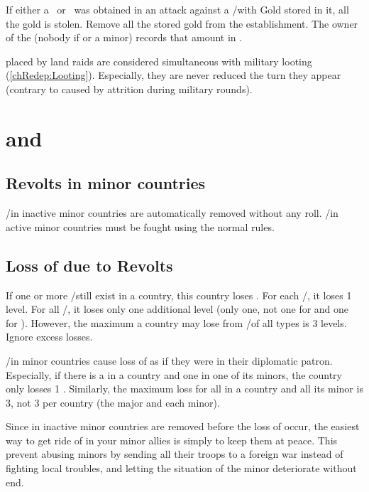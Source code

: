 \bparag If either a \textdag\ or \textddag\ was obtained in an attack against
a \COL/\TP with Gold stored in it, all the gold is stolen.
\bparag Remove all the stored gold from the establishment.
\bparag The owner of the \corsaire (nobody if  or a minor)
records that amount in .

\bparag \PILLAGE placed by land raids are considered simultaneous with
military looting (\ref{chRedep:Looting}).
\bparag Especially, they are never reduced the turn they appear (contrary to
\PILLAGE caused by attrition during military rounds).

\section{\REVOLT and \REBELLION}\label{chRedep:Revolts}
\subsection{Revolts in minor countries}
\aparag \REVOLT/\REBELLION in inactive minor countries are automatically
removed without any roll.
\bparag \REVOLT/\REBELLION in active minor countries must be fought using the
normal rules.

\subsection{Loss of \STAB due to Revolts}
\label{chRedep:Revolts Stability}
\aparag If one or more \REVOLT/\REBELLION still exist in a country, this
country loses \STAB.
\bparag For each \REVOLT/\REBELLION\faceplus, it loses 1 \STAB level.
\bparag For all \REVOLT/\REBELLION\facemoins, it loses only one additional
\STAB level (only one, not one for \REVOLT and one for \REBELLION).
\aparag However, the maximum a country may lose from \REVOLT/\REBELLION of all
types is 3 \STAB levels. Ignore excess losses.

\aparag \REVOLT/\REBELLION in minor countries cause loss of \STAB as if they
were in their diplomatic patron.
\bparag Especially, if there is a \REVOLT\Facemoins in a country and one in
one of its minors, the country only losses 1 \STAB.
\bparag Similarly, the maximum loss for all \REVOLT in a country and all its
minor is 3, not 3 per country (the major and each minor).

\begin{designnote}
  Since \REVOLT in inactive minor countries are removed before the loss of
  \STAB occur, the easiest way to get ride of \REVOLT in your minor allies is
  simply to keep them at peace. This prevent abusing minors by sending all
  their troops to a foreign war instead of fighting local troubles, and
  letting the situation of the minor deteriorate without end.
\end{designnote}

